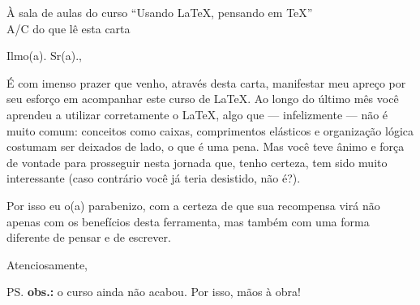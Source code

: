 \documentclass[a4paper,12pt]{letter}
\date{São Paulo, \today}
\begin{document}
	\begin{letter}{À sala de aulas do curso ``Usando \LaTeX, pensando em \TeX'' \\
                 A/C do  que lê esta carta}

	\opening{Ilmo(a). Sr(a).,}

	É com imenso prazer que venho, através desta carta, manifestar meu apreço por
	seu esforço em acompanhar este curso de \LaTeX. Ao longo do último mês você 
	aprendeu a utilizar corretamente o \LaTeX, algo que --- infelizmente --- não
	é muito comum: conceitos como caixas, comprimentos elásticos e organização
	lógica costumam ser deixados de lado, o que é uma pena. Mas você teve ânimo e
	força de vontade para prosseguir nesta jornada que, tenho certeza, tem sido
	muito interessante (caso contrário você já teria desistido, não é?).

	Por isso eu o(a) parabenizo, com a certeza de que sua recompensa virá não
	apenas com os benefícios desta ferramenta, mas também com uma forma diferente
	de pensar e de escrever.	

	\closing{Atenciosamente,}

	\ps{\textbf{obs.:} o curso ainda não acabou. Por isso, mãos à obra!}
	\end{letter}
	
\end{document}
